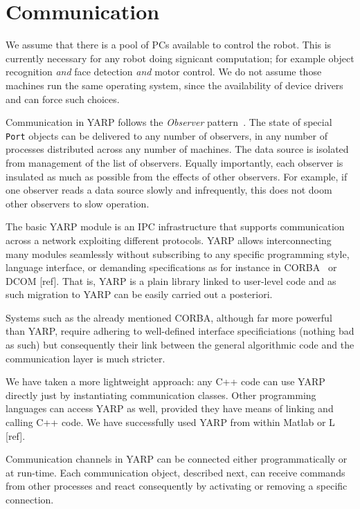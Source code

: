 \section{Communication}
\label{sec:communication}

We assume that there is a pool of PCs available to control the robot.
This is currently necessary for any robot doing signicant computation;
for example object recognition {\em and} face detection {\em and}
motor control.  We do not assume those machines run the same operating
system, since the availability of device drivers and
can force such choices.

Communication in YARP follows the {\em Observer} pattern~\cite{gamma95design}.  The state
of special {\tt Port} objects can be delivered to any number of
observers, in any number of processes distributed across any number of
machines.  The data source is isolated from management of the list
of observers.  Equally importantly, each observer is insulated as
much as possible from the effects of other observers.  For example,
if one observer reads a data source slowly and infrequently, this
does not doom other observers to slow operation.

The basic YARP module is an IPC infrastructure that supports communication across a
network exploiting different protocols. YARP allows interconnecting many modules
seamlessly without subscribing to any specific programming style, language interface, 
or demanding specifications as for instance in CORBA~\cite{vinoski97corba} or DCOM [ref]. That is, YARP 
is a plain library linked to user-level code and as such migration to YARP can be easily
carried out a posteriori. 

Systems such as the already mentioned CORBA, although far more powerful than YARP, require 
adhering to well-defined interface specificiations (nothing bad as such) but consequently 
their link between the general algorithmic code and the communication layer is much 
stricter. 

We have taken a more lightweight approach: any C++ code can use YARP directly just by 
instantiating communication classes. Other programming languages can access YARP as well, 
provided they have means of linking and calling C++ code. We have successfully used YARP 
from within Matlab or L [ref].

Communication channels in YARP can be connected either programmatically or at run-time.
Each communication object, described next, can receive commands from other processes and 
react consequently by activating or removing a specific connection.

